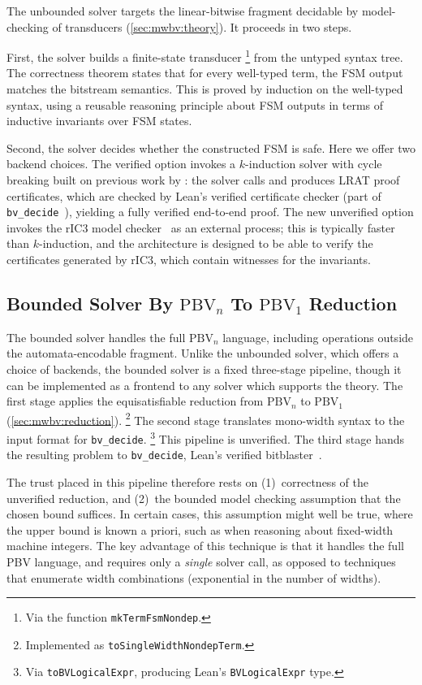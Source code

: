 The unbounded solver targets the linear-bitwise fragment decidable by
model-checking of transducers (\cref{sec:mwbv:theory}). It proceeds in
two steps.

First, the solver builds a finite-state transducer%
\footnote{Via the function \texttt{mkTermFsmNondep}.}
from the untyped syntax tree.
The correctness theorem states that for every well-typed term,
the FSM output matches the bitstream semantics.
This is proved by induction on the well-typed syntax,
using a reusable reasoning principle about FSM outputs
in terms of inductive invariants over FSM states.

Second, the solver decides whether the constructed FSM is safe.
Here we offer two backend choices.
The verified option invokes a $k$-induction solver with cycle breaking built on
previous work by \citet{bhat2025certified}:
the solver calls \cadical{} and produces LRAT proof certificates,
which are checked by Lean's verified certificate checker
(part of \texttt{bv\_decide}~\cite{leanbv}),
yielding a fully verified end-to-end proof.
The new unverified option invokes the rIC3 model checker~\cite{ric3} as an
external process; this is typically faster than $k$-induction, and the
architecture is designed to be able to verify the certificates generated by
rIC3, which contain witnesses for the invariants.

\subsection{Bounded Solver By $\text{PBV}_n$ To $\text{PBV}_1$ Reduction}

The bounded solver handles the full $\text{PBV}_n$ language, including
operations outside the automata-encodable fragment. Unlike the unbounded solver,
which offers a choice of backends, the bounded solver is a fixed three-stage
pipeline, though it can be implemented as a frontend to any solver which
supports the \qfbv{} theory.
%
The first stage applies the equisatisfiable reduction
from $\text{PBV}_n$ to $\text{PBV}_1$ (\cref{sec:mwbv:reduction}).%
\footnote{Implemented as \texttt{toSingleWidthNondepTerm}.}
The second stage translates mono-width syntax to the input format
for \texttt{bv\_decide}.%
\footnote{Via \texttt{toBVLogicalExpr}, producing Lean's \texttt{BVLogicalExpr} type.}
This pipeline is unverified.
The third stage hands the resulting \qfbv{} problem to \texttt{bv\_decide},
Lean's verified bitblaster~\cite{leanbv}.

The trust placed in this pipeline therefore rests on
(1)~correctness of the unverified reduction, and
(2)~the bounded model checking assumption that the chosen bound suffices.
  In certain cases, this assumption might well be true, where the upper bound is known a priori,
  such as when reasoning about fixed-width machine integers.
The key advantage of this technique is that it handles the full PBV language,
and requires only a \emph{single} solver call,
as opposed to techniques that enumerate width combinations
(exponential in the number of widths).

